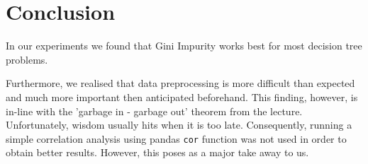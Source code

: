 \section{Conclusion}
In our experiments we found that Gini Impurity works best for most decision tree problems.

Furthermore, we realised that data preprocessing is more difficult than expected and much more important then anticipated beforehand. 
This finding, however, is in-line with the 'garbage in - garbage out' theorem from the lecture. 
Unfortunately, wisdom usually hits when it is too late. Consequently, running a simple correlation analysis using pandas \verb|cor| function was not used in order to obtain better results. 
However, this poses as a major take away to us.
